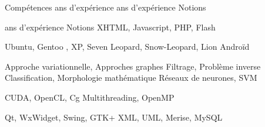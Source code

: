 
\begin{rubric}{Compétences}
   ans d'expérience
   ans d'expérience
   Notions
  
   ans d'expérience
   Notions
   XHTML, Javascript, PHP, Flash
  
  \entry*[Linux] Ubuntu, Gentoo
  , XP, Seven 
  \entry*[Apple] Leopard, Snow-Leopard, Lion
  \entry*[Mobile] Androïd
  
  \entry*[Modélisation] Approche variationnelle, Approches graphes
  \entry*[Restauration] Filtrage, Problème inverse
  \entry*[Segmentation] Classification, Morphologie mathématique
  \entry*[Apprentissage] Réseaux de neurones, SVM
  
   CUDA, OpenCL, Cg
   Multithreading, OpenMP
  
  \entry*[IHM] Qt, WxWidget, Swing, GTK+
   XML, UML, Merise, MySQL
  
  \end{rubric}

